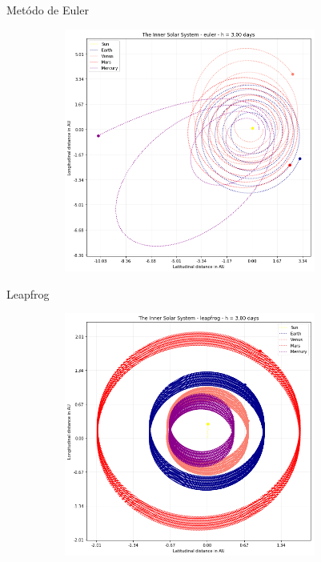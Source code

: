 \documentclass{beamer}
\begin{document}
    \begin{frame}{Metódo de Euler}

      \begin{figure}[h]
        \vspace{-0.5cm}
        \includegraphics[width=100mm, height = 80mm]{resources/earth_wrong.png}
      \end{figure}

    \end{frame}

    \begin{frame}{Leapfrog}

      \begin{figure}[h]
        \vspace{-0.5cm}
        \includegraphics[width=100mm, height = 80mm]{resources/leap3.png}
      \end{figure}

    \end{frame}
\end{document}
